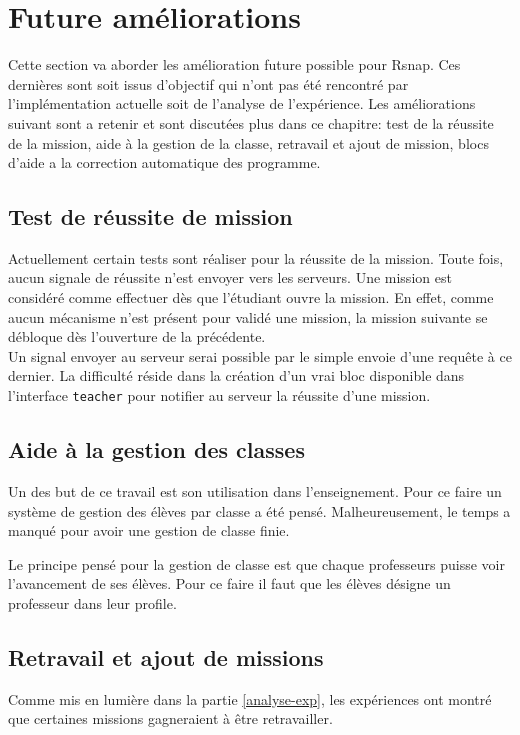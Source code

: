 \chapter{Future améliorations}
Cette section va aborder les amélioration future possible pour Rsnap. Ces dernières sont soit issus d'objectif qui n'ont pas été rencontré par l'implémentation actuelle soit de l'analyse de l'expérience. Les améliorations suivant sont a retenir et sont discutées plus dans ce chapitre: test de la réussite de la mission, aide à la gestion de la classe, retravail et ajout de mission, blocs d'aide a la correction automatique des programme.

\section{Test de réussite de mission}

Actuellement certain tests sont réaliser pour la réussite de la mission. Toute fois, aucun signale de réussite n'est envoyer vers les serveurs. Une mission est considéré comme effectuer dès que l'étudiant ouvre la mission. En effet, comme aucun mécanisme n'est présent pour validé une mission, la mission suivante se débloque dès l'ouverture de la précédente.\\

Un signal envoyer au serveur serai possible par le simple envoie d'une requête à ce dernier. La difficulté réside dans la création d'un vrai bloc disponible dans l'interface \texttt{teacher} pour notifier au serveur la réussite d'une mission.

\section{Aide à la gestion des classes}
Un des but de ce travail est son utilisation dans l'enseignement. Pour ce faire un système de gestion des élèves par classe a été pensé. Malheureusement, le temps a manqué pour avoir une gestion de classe finie. 

Le principe pensé pour la gestion de classe est que chaque professeurs puisse voir l'avancement de ses élèves. Pour ce faire il faut que les élèves désigne un professeur dans leur profile.

\section{Retravail et ajout de missions}
Comme mis en lumière dans la partie \ref{analyse-exp}, les expériences ont montré que certaines missions gagneraient à être retravailler.

